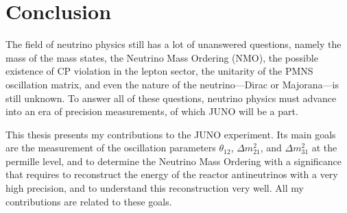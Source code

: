 \documentclass[../main.tex]{subfiles}
\begin{document}
\chapter*{Conclusion}

The field of neutrino physics still has a lot of unanswered questions, namely the mass of the mass states, the Neutrino Mass Ordering (NMO), the possible existence of CP violation in the lepton sector, the unitarity of the PMNS oscillation matrix, and even the nature of the neutrino—Dirac or Majorana—is still unknown. To answer all of these questions, neutrino physics must advance into an era of precision measurements, of which JUNO will be a part.
%
%
%

This thesis presents my contributions to the JUNO experiment. Its main goals are the measurement of the oscillation parameters $\theta_{12}$, $\Delta m^2_{21}$, and $\Delta m^2_{31}$ at the permille level, and to determine the Neutrino Mass Ordering with a significance that requires to reconstruct the energy of the reactor antineutrinos with a very high precision, and to understand this reconstruction very well. All my contributions are related to these goals.
\end{document}
